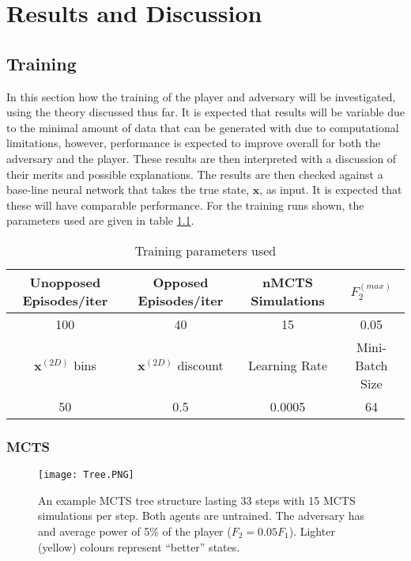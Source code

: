 \documentclass[../main.tex]{subfiles}
\begin{document}
\graphicspath{{Results/Training1/}{../Results/Training1/}{../Results/}{Results/}}
\onlyinsubfile{\tableofcontents{}}
\chapter{Results and Discussion}

\section{Training}

In this section how the training of the player and adversary will be investigated, using the theory discussed thus far. It is expected that results will be variable due to the minimal amount of data that can be generated with due to computational limitations, however, performance is expected to improve overall for both the adversary and the player. These results are then interpreted with a discussion of their merits and possible explanations. The results are then checked against a base-line neural network that takes the true state, $\boldsymbol{x}$, as input. It is expected that these will have comparable performance. For the training runs shown, the parameters used are given in table \ref{table:trainingparams}.

\begin{table}[h]
    \centering
    \begin{tabular}{c | c | c | c}
        Unopposed Episodes/iter & Opposed Episodes/iter & nMCTS Simulations & $F_2^{(max)}$  \\
        \hline
        100 & 40 & 15 & 0.05 \vspace{0.5cm}\\
        $\boldsymbol{x}^{(2D)}$ bins & $\boldsymbol{x}^{(2D)}$ discount & Learning Rate & Mini-Batch Size \\
        \hline
        50 & 0.5 & 0.0005 & 64
    \end{tabular}
    \label{table:trainingparams}
    \caption{Training parameters used}
    \end{table}

\subsection{MCTS}

\begin{figure}[h]
    \centering
    \texttt{[image: Tree.PNG]}
    \caption{An example MCTS tree structure lasting 33 steps with 15 MCTS simulations per step. Both agents are untrained. The adversary has and average power of 5\% of the player ($F_2 = 0.05F_1$). Lighter (yellow) colours represent ``better'' states.}
    \label{fig:tree}
\end{figure}
\end{document}
